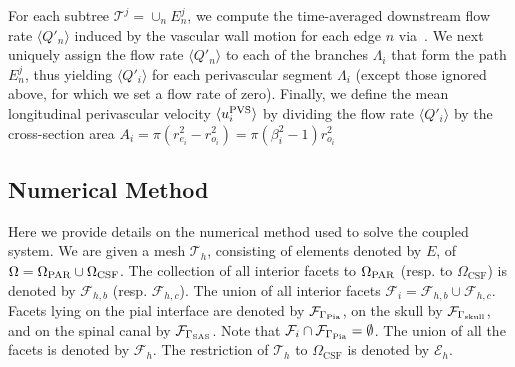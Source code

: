 \documentclass[fleqn,10pt]{wlscirep}
\newcommand{\brain}{\Omega_{\rm{PAR}}}
\newcommand{\sas}{\Omega_{\rm CSF}}
\newcommand{\pia}{\Gamma_{\rm{Pia}}}
\newcommand{\spinal}{\Gamma_{\rm SAS}}
\newcommand{\skull}{\Gamma_{\rm{skull}}}
\begin{document}
For each subtree $\mathcal{T}^j = \cup_n E_n^j$, we compute the
time-averaged downstream flow rate $\langle Q'_n \rangle$ induced by
the vascular wall motion for each edge $n$ via~\cite[eq.~(5),
  (34)]{gjerde2023directional}. We next uniquely assign the flow rate
$\langle Q'_n \rangle$ to each of the branches $\Lambda_i$ that form
the path $E_n^j$, thus yielding $\langle Q'_i \rangle$ for each
perivascular segment $\Lambda_i$ (except those ignored above, for
which we set a flow rate of zero). Finally, we define the mean
longitudinal perivascular velocity $\langle u^{\rm PVS}_i \rangle$ by
dividing the flow rate $\langle Q'_i \rangle$ by the cross-section
area $A_i = \pi (r_{e_i}^2 - r_{o_i}^2) = \pi (\beta_i^2 - 1) r_{o_i}^2$


\subsection{Numerical Method} \label{sec:details_numerical_method}
Here we provide details on the numerical method used to solve the coupled system. We are given a mesh $\mathcal{T}_h $, consisting of elements denoted by $E$, of $\Omega= \brain \cup \sas$.  The collection of all interior facets to $\Omega_{\rm PAR}$ (resp.  to $\Omega_{\mathrm{CSF}}$) is  denoted by $\mathcal{F}_{h,b}$ (resp. $\mathcal{F}_{h,c}$).  The union of all interior facets $\mathcal{F}_i = \mathcal{F}_{h,b} \cup \mathcal{F}_{h,c}$. Facets lying on the pial interface are denoted by $\mathcal{F}_{\pia}$, on the skull by $\mathcal{F}_{\skull}$, and on the spinal canal by $\mathcal{F}_{\spinal}$. Note that $\mathcal{F}_i \cap \mathcal{F}_{\pia} = \emptyset $. The union of all the facets is denoted by $\mathcal{F}_h$. The restriction of $\mathcal{T}_h $ to $\Omega_{\mathrm{CSF}}$ is denoted by $\mathcal{E}_{h}$. 
\end{document}
